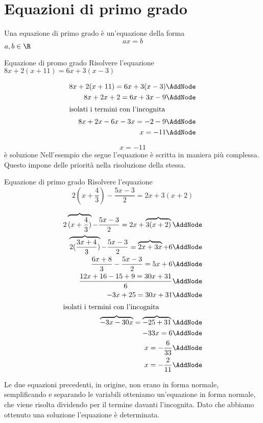 \section{Equazioni di primo grado}
\label{sec:equazionidiprimogrado}
\begin{definizionet}{}{}
Una equazione di primo grado è un'equazione della forma \[ax=b\]
$a,b\in\R$
\end{definizionet}
\begin{esempiot}{Equazione di promo grado}{}
Risolvere l'equazione $8x+2(x+11) = 6x+3(x-3) $
\end{esempiot}
 \begin{NodesList}[margin=3cm]
  \begin{align*}
  8x+2(x+11) = 6x+3(x-3) \AddNode\\
  8x+2x+2  = 6x+3x-9 \AddNode\\
  \intertext{\hfil isolati i termini con l'incognita \hfil}
  8x+2x-6x-3x  = -2-9 \AddNode\\
    x  = -11 \AddNode
  \end{align*}
  \LinkNodes{ }
  \end{NodesList}
  \[x=-11\]
  è soluzione
Nell'esempio che segue l'equazione è scritta in maniera più complessa. Questo impone delle priorità nella risoluzione della stessa. 
\begin{esempiot}{Equazione di primo grado}{}
Risolvere l'equazione \[2(x+\dfrac{4}{3})-\dfrac{5x-3}{2}=2x+3(x+2) \]
\end{esempiot}
 \begin{NodesList}[margin=3cm]
  \begin{align*}
  2\overbrace{(x+\dfrac{4}{3})}-\dfrac{5x-3}{2}=2x+\overbrace{3(x+2)} \AddNode\\
\overbrace{2(\dfrac{3x+4}{3})}-\dfrac{5x-3}{2}=\overbrace{2x+3x}+6 \AddNode\\
  \dfrac{6x+8}{3}-\dfrac{5x-3}{2}=5x+6   \AddNode\\
 \dfrac{12x+16-15+9=30x+31}{6}   \AddNode\\
 -3x+25=30x+31\AddNode\\
  \intertext{\hfil isolati i termini con l'incognita \hfil}
 \overbrace{-3x-30x}=\overbrace{-25+31}\AddNode\\
 -33x=6\AddNode\\
 x=-\dfrac{6}{33}\AddNode\\
 x=-\dfrac{2}{11}\AddNode\\
  \end{align*}
  \end{NodesList}
Le due equazioni precedenti, in origine, non erano in forma normale, semplificando e separando le variabili otteniamo un'equazione in forma normale,  che viene risolta dividendo per il termine davanti l'incognita. Dato che abbiamo ottenuto una soluzione l'equazione è determinata.
 
